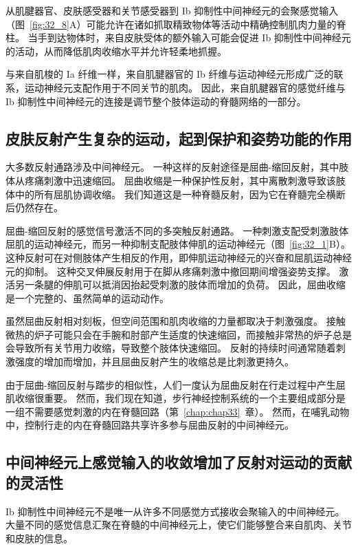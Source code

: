 从肌腱器官、皮肤感受器和关节感受器到 Ib 抑制性中间神经元的会聚感觉输入（图~\ref{fig:32_8}A）可能允许在诸如抓取精致物体等活动中精确控制肌肉力量的脊柱。
当手到达物体时，来自皮肤受体的额外输入可能会促进 Ib 抑制性中间神经元的活动，从而降低肌肉收缩水平并允许轻柔地抓握。


与来自肌梭的 Ia 纤维一样，来自肌腱器官的 Ib 纤维与运动神经元形成广泛的联系，运动神经元支配作用于不同关节的肌肉。
因此，来自肌腱器官的感觉纤维与 Ib 抑制性中间神经元的连接是调节整个肢体运动的脊髓网络的一部分。



\subsection{皮肤反射产生复杂的运动，起到保护和姿势功能的作用}

大多数反射通路涉及中间神经元。
一种这样的反射途径是屈曲-缩回反射，其中肢体从疼痛刺激中迅速缩回。
屈曲收缩是一种保护性反射，其中离散刺激导致该肢体中的所有屈肌协调收缩。
我们知道这是一种脊髓反射，因为它在脊髓完全横断后仍然存在。


屈曲-缩回反射的感觉信号激活不同的多突触反射通路。 
一种刺激支配受刺激肢体屈肌的运动神经元，而另一种抑制支配肢体伸肌的运动神经元（图~\ref{fig:32_1}B）。
这种反射可在对侧肢体产生相反的作用，即伸肌运动神经元的兴奋和屈肌运动神经元的抑制。
这种交叉伸展反射用于在脚从疼痛刺激中撤回期间增强姿势支撑。
激活另一条腿的伸肌可以抵消因抬起受刺激的肢体而增加的负荷。
因此，屈曲收缩是一个完整的、虽然简单的运动动作。


虽然屈曲反射相对刻板，但空间范围和肌肉收缩的力量都取决于刺激强度。
接触微热的炉子可能只会在手腕和肘部产生适度的快速缩回，而接触非常热的炉子总是会导致所有关节用力收缩，导致整个肢体快速缩回。
反射的持续时间通常随着刺激强度的增加而增加，并且屈曲反射产生的收缩总是比刺激更持久。


由于屈曲-缩回反射与踏步的相似性，人们一度认为屈曲反射在行走过程中产生屈肌收缩很重要。
然而，我们现在知道，步行神经控制系统的一个主要组成部分是一组不需要感觉刺激的内在脊髓回路（第~\ref{chap:chap33}~章）。
然而，在哺乳动物中，控制行走的内在脊髓回路共享许多参与屈曲反射的中间神经元。



\subsection{中间神经元上感觉输入的收敛增加了反射对运动的贡献的灵活性}

Ib 抑制性中间神经元不是唯一从许多不同感觉方式接收会聚输入的中间神经元。
大量不同的感觉信息汇聚在脊髓的中间神经元上，使它们能够整合来自肌肉、关节和皮肤的信息。


